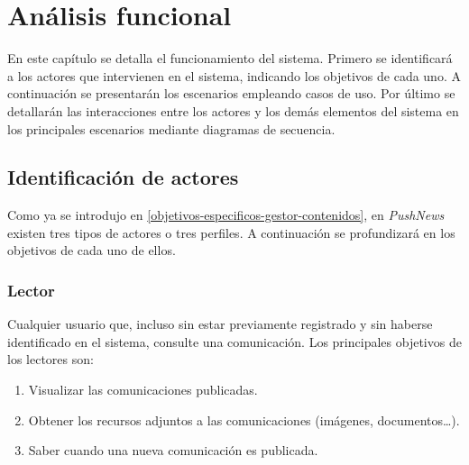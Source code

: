 \chapter{Análisis funcional}
En este capítulo se detalla el funcionamiento del sistema. Primero se identificará a los actores que intervienen en el sistema, indicando los objetivos de cada uno. A continuación se presentarán los escenarios empleando casos de uso. Por último se detallarán las interacciones entre los actores y los demás elementos del sistema en los principales escenarios mediante diagramas de secuencia.

\section{Identificación de actores}
Como ya se introdujo en \ref{objetivos-especificos-gestor-contenidos}, en \emph{PushNews} existen tres tipos de actores o tres perfiles. A continuación se profundizará en los objetivos de cada uno de ellos.

\subsection{Lector}
Cualquier usuario que, incluso sin estar previamente registrado y sin haberse identificado en el sistema, consulte una comunicación. Los principales objetivos de los lectores son:
\begin{enumerate}
    \item Visualizar las comunicaciones publicadas.
    \item Obtener los recursos adjuntos a las comunicaciones (imágenes, documentos\dots).
    \item Saber cuando una nueva comunicación es publicada.
\end{enumerate}

